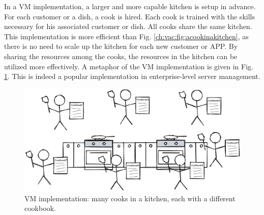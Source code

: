 In a VM implementation, a larger and more capable kitchen is setup in advance. For each customer or a dish, a cook is hired. Each cook is trained with the skills necessary for his associated customer or dish. All cooks share the same kitchen. This implementation is more efficient than Fig. \ref{ch:vac:fig:acookinakitchen}, as there is no need to scale up the kitchen for each new customer or APP. By sharing the resources among the cooks, the resources in the kitchen can be utilized more effectively. A metaphor of the VM implementation is given in Fig. \ref{ch:vac:fig:manycooksinakitchen}. This is indeed a popular implementation in enterprise-level server management.
\begin{figure}
	\centering \includegraphics[width=350pt]{chapters/ch-virtualization-and-containerization/figures/manycooksinakitchen.png}
	\caption{VM implementation: many cooks in a kitchen, each with a different cookbook.} \label{ch:vac:fig:manycooksinakitchen}
\end{figure}

